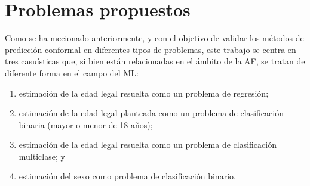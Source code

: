 




\section{Problemas propuestos}

Como se ha mecionado anteriormente, y con el objetivo de validar los métodos de predicción conformal en diferentes tipos de problemas, este trabajo se centra en tres casuísticas que, si bien están relacionadas en el ámbito de la AF, se tratan de diferente forma en el campo del ML: 

\begin{enumerate}

    \item estimación de la edad legal resuelta como un problema de regresión; 
    
    \item estimación de la edad legal planteada como un problema de clasificación binaria (mayor o menor de 18 años); 
    
    \item estimación de la edad legal resuelta como un problema de clasificación multiclase; y
    
    \item estimación del sexo como problema de clasificación binario.
    

\end{enumerate}

